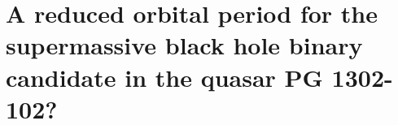 \chapter[A Reduced Orbital Period for PG 1302-102]{A reduced orbital period for the supermassive black hole binary candidate in the quasar PG 1302-102?}
\label{ch:PG1302_a}



%










